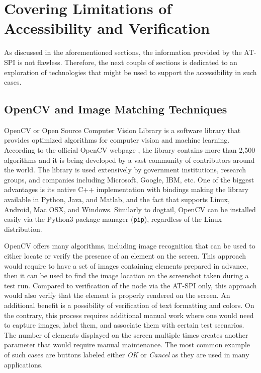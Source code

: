 \section{Covering Limitations of Accessibility and Verification}
As discussed in the aforementioned sections, the information provided by the AT-SPI is not flawless. Therefore, the next couple of sections is dedicated to an exploration of technologies that might be used to support the accessibility in such cases.

\subsection{OpenCV and Image Matching Techniques}
OpenCV or Open Source Computer Vision Library is a software library that provides optimized algorithms for computer vision and machine learning. According to the official OpenCV webpage \cite{opencv}, the library contains more than 2,500 algorithms and it is being developed 
by a vast community of contributors around the world. The library is used extensively by government institutions, research groups, and companies including Microsoft, Google, IBM, etc. One of the biggest advantages is its native C++ implementation with bindings making the library available in Python, Java, and Matlab, and the fact that supports Linux, Android, Mac OSX, and Windows. Similarly to dogtail, OpenCV can be installed easily via the Python3 package manager (\texttt{pip}), regardless of the Linux distribution. 

OpenCV offers many algorithms, including image recognition that can be used to either locate or verify the presence of an element on the screen. This approach would require to have a set of images containing elements prepared in advance, then it can be used to find the image location on the screenshot taken during a test run. Compared to verification of the node via the AT-SPI only, this approach would also verify that the element is properly rendered on the screen. An additional benefit is a possibility of verification of text formatting and colors. On the contrary, this process requires additional manual work where one would need to capture images, label them, and associate them with certain test scenarios. The number of elements displayed on the screen multiple times creates another parameter that would require manual maintenance. The most common example of such cases are buttons labeled either \textit{OK} or \textit{Cancel} as they are used in many applications.

